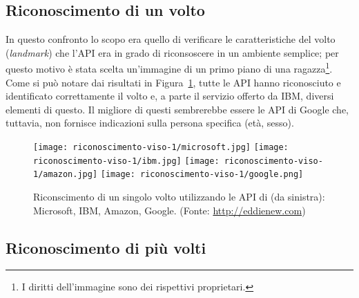 \subsection{Riconoscimento di un volto}\label{subsec:riconscimento-singolo-volto}
In questo confronto lo scopo era quello di verificare le caratteristiche del volto (\textit{landmark}) che l'API era in grado di riconsoscere in un ambiente semplice;
per questo motivo è stata scelta un'immagine di un primo piano di una ragazza\footnote{I diritti dell'immagine sono dei rispettivi proprietari.}.
Come si può notare dai risultati in Figura~\ref{fig:riconscimento-singolo-volto}, tutte le API hanno riconosciuto e identificato correttamente il volto e, a parte
il servizio offerto da IBM, diversi elementi di questo.
Il migliore di questi sembrerebbe essere le API di Google che, tuttavia, non fornisce indicazioni sulla persona specifica (età, sesso).
\begin{figure}[!h]
\begin{center}
	\texttt{[image: riconoscimento-viso-1/microsoft.jpg]}
	\texttt{[image: riconoscimento-viso-1/ibm.jpg]}
	\texttt{[image: riconoscimento-viso-1/amazon.jpg]}
	\texttt{[image: riconoscimento-viso-1/google.png]}
{\scriptsize \caption{Riconscimento di un singolo volto utilizzando le API di (da sinistra): Microsoft, IBM, Amazon, Google. (Fonte: \url{http://eddienew.com})}
\label{fig:riconscimento-singolo-volto}}
\end{center}
\end{figure}
%
\subsection{Riconoscimento di più volti}\label{subsec:riconscimento-piu-volti}
%
